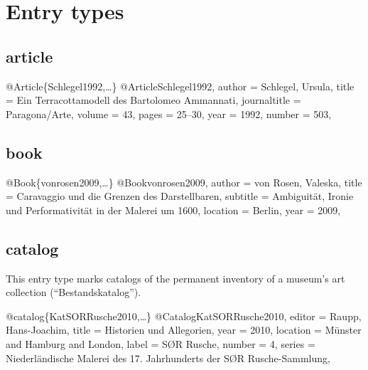 \documentclass[a4paper,
10pt,
ngerman,
english
]{ltxdoc}
\begin{document}
%
%
%
%
%
%
%

\section{Entry types}
\subsection{article}
\begin{bibexample}[label=Schlegel1992]{{@}Article\{Schlegel1992,…\}}
@Article{Schlegel1992,
  author       = {Schlegel, Ursula},
  title        = {Ein Terracottamodell des Bartolomeo Ammannati},
  journaltitle = {Paragona/Arte},
  volume       = {43},
  pages        = {25--30},
  year         = {1992},
  number       = {503},
}
\end{bibexample}


\subsection{book}
\begin{bibexample}[label=vonrosen2009]{{@}Book\{vonrosen2009,…\}}
@Book{vonrosen2009,
  author   = {von Rosen, Valeska},
  title    = {Caravaggio und die Grenzen des Darstellbaren},
  subtitle = {Ambiguität, Ironie und Performativität in der Malerei um 1600},
  location = {Berlin},
  year     = {2009},
}
\end{bibexample}

\subsection{catalog}
This entry type marks catalogs of the permanent inventory of a museum's art collection (\enquote{Bestandskatalog}).
\begin{bibexample}[label=KatSORRusche2010]{{@}catalog\{KatSORRusche2010,…\}}
@Catalog{KatSORRusche2010,
  editor   = {Raupp, Hans-Joachim},
  title    = {Historien und Allegorien},
  year     = {2010},
  location = {Münster and Hamburg and London},
  label    = {S{{\O}}R Rusche},
  number   = {4},
  series   = {Niederländische Malerei des 17. Jahrhunderts der S{{\O}}R Rusche-Sammlung},
}
\end{bibexample}
\end{document}
